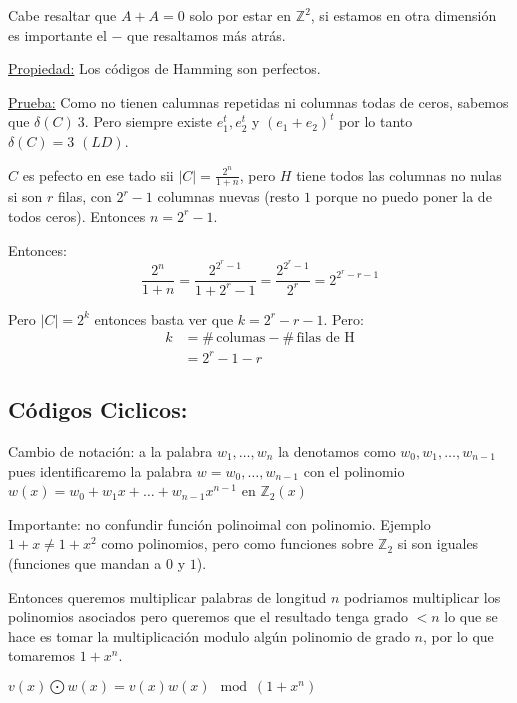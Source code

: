 \documentclass[12pt,a4paper]{article}
\begin{document}
Cabe resaltar que $A+A=0$ solo por estar en $\mathbb{Z}^{2}$, si estamos en otra 
dimensión es importante el $-$ que resaltamos más atrás.
\medskip

\underline{Propiedad:} Los códigos de Hamming son perfectos.
\medskip

\underline{Prueba:} Como no tienen calumnas repetidas ni columnas todas de ceros, 
sabemos que $\delta(C) \> 3$. Pero siempre existe $e_{1}^{t}, e_{2}^{t}$ y 
$(e_{1}+e_{2})^{t}$ por lo tanto $\delta(C) = 3\,\, (LD)$.
\medskip

$C$ es pefecto en ese tado sii $|C| = \frac{2^{n}}{1+n}$, pero $H$ tiene todos las 
columnas no nulas si son $r$ filas, con $2^{r}-1$ columnas nuevas (resto $1$ porque 
no puedo poner la de todos ceros). Entonces $n = 2^{r}-1$.
\medskip

Entonces:
$$\frac{2^{n}}{1+n} = \frac{2^{2^{r}-1}}{1+2^{r}-1} = \frac{2^{2^{r}-1}}{2^{r}} = 2^{2^{r}-r-1}$$

Pero $|C|=2^{k}$ entonces basta ver que $k = 2^{r}-r-1$. Pero:
\begin{align*}
    k &= \#\,\text{columas}-\#\,\text{filas de H} \\
    &= 2^{r} - 1 -r
\end{align*}

\subsection{Códigos Ciclicos:}

Cambio de notación: a la palabra $w_{1},\ldots,w_{n}$ la denotamos como 
$w_{0},w_{1},\ldots,w_{n-1}$ pues identificaremo la palabra $w=w_{0},\ldots,w_{n-1}$
con el polinomio $w(x) = w_{0} + w_{1}x + \ldots + w_{n-1}x^{n-1}$ en $\mathbb{Z}_{2}(x)$
\medskip

Importante: no confundir función polinoimal con polinomio. Ejemplo $1+x \neq 1+x^{2}$ 
como polinomios, pero como funciones sobre $\mathbb{Z}_{2}$ si son iguales (funciones 
que mandan a $0$ y $1$).
\medskip

Entonces queremos multiplicar palabras de longitud $n$ podriamos multiplicar los 
polinomios asociados pero queremos que el resultado tenga grado $<n$ lo que se hace 
es tomar la multiplicación modulo algún polinomio de grado $n$, por lo que tomaremos 
$1+x^{n}$.
\medskip

\begin{definition} $v(x) \bigodot w(x) = v(x)w(x) \mod (1+x^{n})$
\end{definition}
\end{document}

